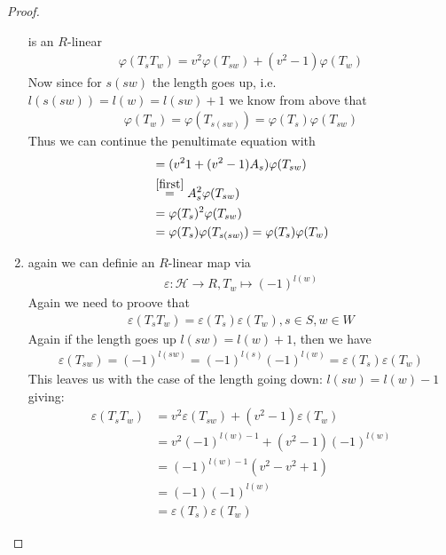 \documentclass[]{article}
\begin{document}
\begin{proof}
\begin{enumerate}
        is an \(R\)-linear
        \begin{align*}
            \varphi(T_s T_w) = v^2 \varphi(T_{sw}) + (v^2 -1) \varphi(T_w)
        \end{align*}
        Now since for \(s(sw)\) the length goes up, i.e. \(l(s(sw))= l(w)= l(sw)+1\) we know from above that
        \begin{align*}
            \varphi(T_w)=\varphi(T_{s(sw)})=\varphi(T_s) \varphi(T_{sw})
        \end{align*}
        Thus we can continue the penultimate equation with
        \begin{align*}
            &= (v^2 1 + (v^2-1)A_s)\varphi(T_{sw}) \\
            &\overset{\ref{first}}{=} A_s^2 \varphi(T_{sw}) \\
                        &= \varphi(T_s)^2\varphi(T_{sw}) \\
            &=\varphi(T_s) \varphi(T_{s(sw)}) = \varphi(T_s) \varphi(T_w)
        \end{align*}
    \item again we can definie an \(R\)-linear map via
    \begin{align*}
        \varepsilon: \mathscr{H}  \rightarrow R, T_w \mapsto (-1)^{l(w)}
    \end{align*}
    Again we need to proove that
    \begin{align*}
        \varepsilon(T_s T_w)= \varepsilon(T_s) \varepsilon(T_w), s \in S, w \in W
    \end{align*}
    Again if the length goes up \(l(sw)=l(w)+1\), then we have
        \begin{align*}
            \varepsilon(T_{sw})= (-1)^{l(sw)} = (-1)^{l(s)} (-1)^{l(w)} = \varepsilon(T_s)\varepsilon(T_w)
        \end{align*}
    This leaves us with the case of the length going down: \(l(sw)=l(w)-1\) giving:
    \begin{align*}
        \varepsilon(T_s T_w) &= v^2 \varepsilon(T_{sw}) + (v^2-1) \varepsilon(T_w) \\
        &=v^2 (-1)^{l(w)-1} + (v^2-1) (-1)^{l(w)} \\
        &=(-1)^{l(w)-1}(v^2-v^2+1) \\
        &=(-1)(-1)^{l(w)} \\
        &= \varepsilon(T_s) \varepsilon(T_w)
    \end{align*}
    \end{enumerate}
\end{proof}
\end{document}
